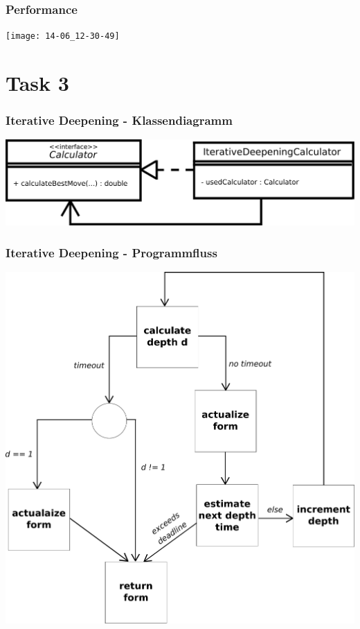 \documentclass{beamer}
\begin{document}
\begin{frame}
\frametitle{Performance}
  \begin{center} 
    \texttt{[image: 14-06\_12-30-49]}
  \end{center}
  
\end{frame}

\section{Task 3}

\begin{frame}
\centering
\frametitle{Iterative Deepening - Klassendiagramm}
\includegraphics[scale=0.25]{deepener-classdiagram}
\end{frame}

\begin{frame}
\centering
\frametitle{Iterative Deepening - Programmfluss}
\includegraphics[scale=0.17]{deepener-flow-chart}
\end{frame}
\end{document}
